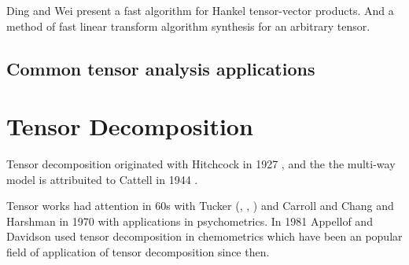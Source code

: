 \documentclass[letterpaper,12pt]{article}
\begin{document}








Ding and Wei \cite{Ding2015} present a fast algorithm for Hankel tensor-vector products. And \cite{Dourbal2016} a method of fast linear transform algorithm synthesis for an arbitrary tensor.


\subsection{Common tensor analysis applications}\label{sec:tensor_apps}


\section{Tensor Decomposition}


Tensor decomposition originated with Hitchcock in 1927 \cite{Hitchcock1927}, and the the multi-way model is attribuited to Cattell in 1944 \cite{Cattell1944}.

Tensor works had attention in 60s with Tucker (\cite{Tucker1963}, \cite{Tucker1964}, \cite{Tucker1966}) and Carroll and Chang \cite{Carroll1970} and Harshman in 1970 \cite{Harshman1970} with applications in psychometrics. In 1981 Appellof and Davidson \cite{Appellof1981} used tensor decomposition in chemometrics which have been an popular field of application of tensor decomposition since then.
\end{document}
